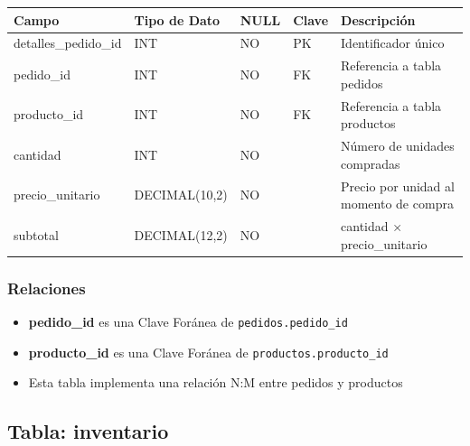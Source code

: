\begin{center}
\begin{tabular}{|l|l|l|l|p{4cm}|}
    \hline
    \textbf{Campo} & \textbf{Tipo de Dato} & \textbf{NULL} & \textbf{Clave} & \textbf{Descripción} \\
    \hline
    detalles_pedido_id & INT & NO & PK & Identificador único \\
    \hline
    pedido_id & INT & NO & FK & Referencia a tabla pedidos \\
    \hline
    producto_id & INT & NO & FK & Referencia a tabla productos \\
    \hline
    cantidad & INT & NO & & Número de unidades compradas \\
    \hline
    precio_unitario & DECIMAL(10,2) & NO & & Precio por unidad al momento de compra \\
    \hline
    subtotal & DECIMAL(12,2) & NO & & cantidad × precio\_unitario \\
    \hline
\end{tabular}
\end{center}

\subsubsection{Relaciones}
\begin{itemize}
    \item \textbf{pedido\_id} es una Clave Foránea de \texttt{pedidos.pedido\_id}
    \item \textbf{producto\_id} es una Clave Foránea de \texttt{productos.producto\_id}
    \item Esta tabla implementa una relación N:M entre pedidos y productos
\end{itemize}


\subsection{Tabla: inventario}

